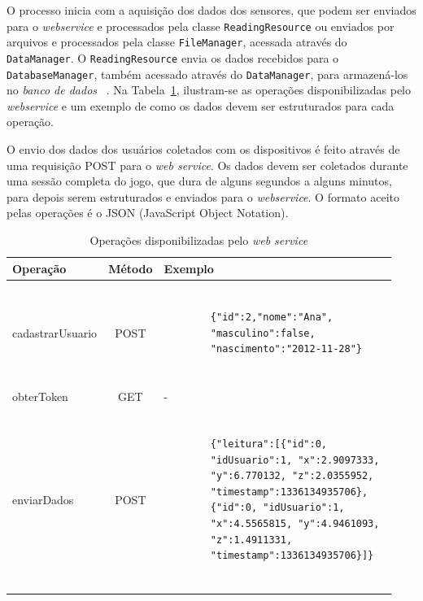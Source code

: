 O processo inicia com a aquisição dos dados dos sensores, que podem ser enviados para o \emph{webservice} e processados pela classe \texttt{ReadingResource} ou enviados por arquivos e processados pela classe \texttt{FileManager}, acessada através do \texttt{DataManager}. O \texttt{ReadingResource} envia os dados recebidos para o \texttt{DatabaseManager}, também acessado através do \texttt{DataManager}, para armazená-los no \emph{banco de dados} ~\cite{antonio2013}. Na Tabela~\ref{tab:operations}, ilustram-se as operações disponibilizadas pelo \textit{webservice} e um exemplo de como os dados devem ser estruturados para cada operação.

O envio dos dados dos usuários coletados com os dispositivos é feito através de uma requisição POST para o \textit{web service}. Os dados devem ser coletados durante uma sessão completa do jogo, que dura de alguns segundos a alguns minutos, para depois serem estruturados e enviados para o \textit{webservice}. O formato aceito pelas operações é o JSON (JavaScript Object Notation). 

\begin{table} 
\centering 
\caption{Operações disponibilizadas pelo \textit{web service}}
\begin{center}
    \begin{tabular}{ | l | c | l | }
        \hline
        Operação & Método & Exemplo \\ \hline
        cadastrarUsuario & POST & 
		\begin{minipage}{7cm}\begin{verbatim}
		
		{"id":2,"nome":"Ana",
		"masculino":false,
		"nascimento":"2012-11-28"}
		
		\end{verbatim}\end{minipage} \\ \hline
        obterToken & GET & - \\ \hline
        enviarDados & POST & 
		\begin{minipage}{7.5cm}\begin{verbatim}

		{"leitura":[{"id":0, 
		"idUsuario":1, "x":2.9097333, 
		"y":6.770132, "z":2.0355952, 
		"timestamp":1336134935706}, 
		{"id":0, "idUsuario":1, 
		"x":4.5565815, "y":4.9461093, 
		"z":1.4911331, 
		"timestamp":1336134935706}]}
		
		\end{verbatim}\end{minipage} \\ \hline
    \end{tabular}
\end{center}
\label{tab:operations}
\end{table}

